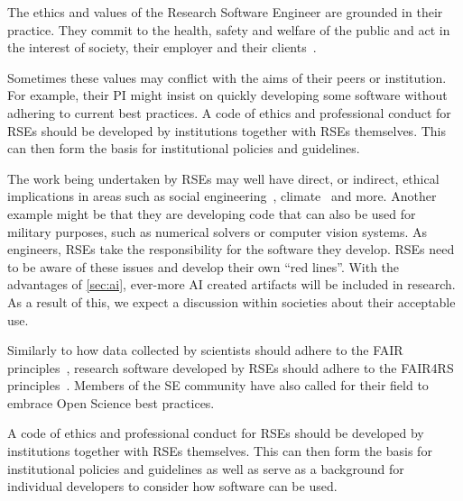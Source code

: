 \documentclass{eceasst}
\begin{document}
The ethics and values of the Research Software Engineer are grounded in their practice.
They commit to the health, safety and welfare of the public and act in the interest of society, their employer and their clients~\cite{Goth2024}.

Sometimes these values may conflict with the aims of their peers or institution.
For example, their PI might insist on quickly developing some software without adhering to current best practices.
A code of ethics and professional conduct for RSEs should be developed by institutions together with RSEs themselves.
This can then form the basis for institutional policies and guidelines.

The work being undertaken by RSEs may well have direct, or indirect,
ethical implications in areas such as social engineering~\cite{s2erc,Siadati2024},
climate~\cite{Lannelongue2023} and more.
Another example might be that they are developing code that can also be used
for military purposes, such as numerical solvers or computer vision systems.
As engineers, RSEs take the responsibility for the software they develop.
RSEs need to be aware of these issues and develop their own ``red lines''.
With the advantages of \autoref{sec:ai}, ever-more AI created artifacts will be included in research.
As a result of this, we expect a discussion within societies about their acceptable use.

Similarly to how data collected by scientists should adhere to the FAIR principles~\cite{FAIR},
research software developed by RSEs should adhere to the FAIR4RS principles~\cite{FAIR4RS}.
Members of the SE community have also called for their field to embrace Open Science best practices\cite{OliveiraJr2024,Druskat2025}.

A code of ethics and professional conduct for RSEs should be developed by institutions together with RSEs themselves.
This can then form the basis for institutional policies and guidelines as well as serve as a background for individual developers to consider how software can be used.
\end{document}
